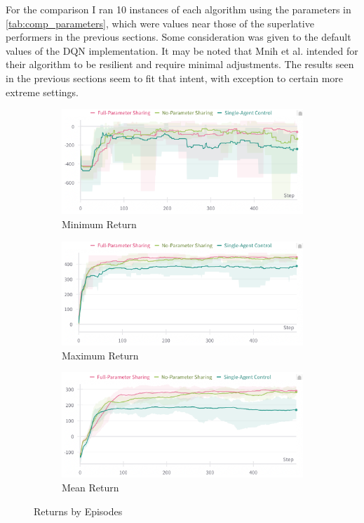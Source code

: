 \documentclass[12pt,letterpaper]{exam}
\begin{document}
\begin{questions}
For the comparison I ran 10 instances of each algorithm using the 
parameters in \cref{tab:comp_parameters}, which were values near 
those of the superlative performers in the previous sections.
Some consideration was given to the default values of the DQN implementation. 
It may be noted that Mnih et al. \cite{mnih2015} intended for their algorithm 
to be resilient and require minimal adjustments.
The results seen in the previous sections seem to fit that intent,
with exception to certain more extreme settings.

\begin{figure}[b]
    \centering
    \begin{subfigure}{.48\textwidth}
        \centering
        \includegraphics[width=\linewidth]{ep_return_min.png}
        \caption{Minimum Return}
    \end{subfigure}
    \hfil
    \begin{subfigure}{.48\textwidth}
        \centering
        \includegraphics[width=\linewidth]{ep_return_max.png}
        \caption{Maximum Return}
    \end{subfigure}
    \begin{subfigure}{.65\textwidth}
        \centering
        \includegraphics[width=\linewidth]{ep_return_mean.png}
        \caption{Mean Return}
    \end{subfigure}
    \caption{Returns by Episodes}
    \label{fig:ep_returns}
\end{figure}


\end{questions}
\end{document}
